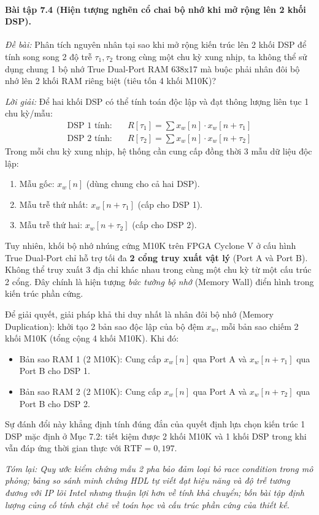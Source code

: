 \paragraph{Bài tập 7.4 (Hiện tượng nghẽn cổ chai bộ nhớ khi mở rộng lên 2 khối DSP).}
\textit{Đề bài:} Phân tích nguyên nhân tại sao khi mở rộng kiến trúc lên 2 khối DSP để tính song song 2 độ trễ $\tau_1, \tau_2$ trong cùng một chu kỳ xung nhịp, ta không thể sử dụng chung 1 bộ nhớ True Dual-Port RAM 638x17 mà buộc phải nhân đôi bộ nhớ lên 2 khối RAM riêng biệt (tiêu tốn 4 khối M10K)?

\textit{Lời giải:}
Để hai khối DSP có thể tính toán độc lập và đạt thông lượng liên tục 1 chu kỳ/mẫu:
\begin{align}
\text{DSP 1 tính:} \quad & R[\tau_1] = \sum x_w[n] \cdot x_w[n+\tau_1] \\
\text{DSP 2 tính:} \quad & R[\tau_2] = \sum x_w[n] \cdot x_w[n+\tau_2]
\end{align}
Trong mỗi chu kỳ xung nhịp, hệ thống cần cung cấp đồng thời 3 mẫu dữ liệu độc lập:
\begin{enumerate}[itemsep=1pt]
    \item Mẫu gốc: $x_w[n]$ (dùng chung cho cả hai DSP).
    \item Mẫu trễ thứ nhất: $x_w[n+\tau_1]$ (cấp cho DSP 1).
    \item Mẫu trễ thứ hai: $x_w[n+\tau_2]$ (cấp cho DSP 2).
\end{enumerate}
Tuy nhiên, khối bộ nhớ nhúng cứng M10K trên FPGA Cyclone V ở cấu hình True Dual-Port chỉ hỗ trợ tối đa \textbf{2 cổng truy xuất vật lý} (Port A và Port B). Không thể truy xuất 3 địa chỉ khác nhau trong cùng một chu kỳ từ một cấu trúc 2 cổng. Đây chính là hiện tượng \emph{bức tường bộ nhớ} (Memory Wall) điển hình trong kiến trúc phần cứng.

Để giải quyết, giải pháp khả thi duy nhất là nhân đôi bộ nhớ (Memory Duplication): khởi tạo 2 bản sao độc lập của bộ đệm $x_w$, mỗi bản sao chiếm 2 khối M10K (tổng cộng 4 khối M10K). Khi đó:
\begin{itemize}[leftmargin=1.5em, itemsep=2pt]
    \item Bản sao RAM 1 (2 M10K): Cung cấp $x_w[n]$ qua Port A và $x_w[n+\tau_1]$ qua Port B cho DSP 1.
    \item Bản sao RAM 2 (2 M10K): Cung cấp $x_w[n]$ qua Port A và $x_w[n+\tau_2]$ qua Port B cho DSP 2.
\end{itemize}
Sự đánh đổi này khẳng định tính đúng đắn của quyết định lựa chọn kiến trúc 1 DSP mặc định ở Mục 7.2: tiết kiệm được 2 khối M10K và 1 khối DSP trong khi vẫn đáp ứng thời gian thực với $\text{RTF} = 0{,}197$.

\textit{Tóm lại: Quy ước kiểm chứng mẫu 2 pha bảo đảm loại bỏ race condition trong mô phỏng; bảng so sánh minh chứng HDL tự viết đạt hiệu năng và độ trễ tương đương với IP lõi Intel nhưng thuận lợi hơn về tính khả chuyển; bốn bài tập định lượng củng cố tính chặt chẽ về toán học và cấu trúc phần cứng của thiết kế.}
